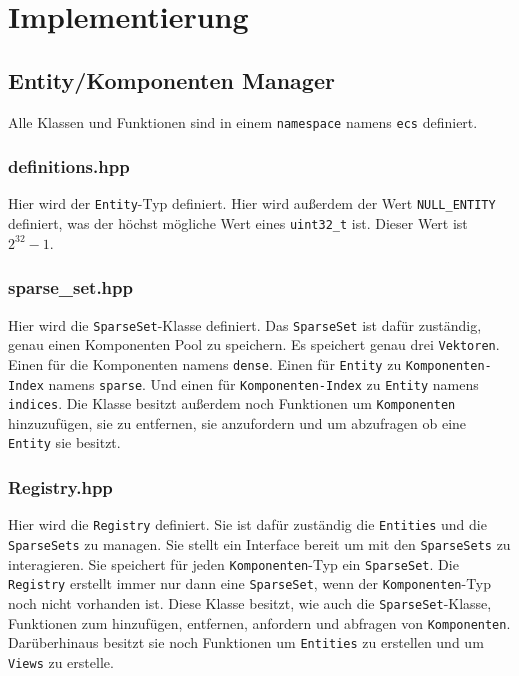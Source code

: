 \documentclass[12pt, a4paper, oneside, ngerman]{scrartcl}
\begin{document}
\section{Implementierung}
\subsection{Entity/Komponenten Manager}
Alle Klassen und Funktionen sind in einem \texttt{namespace} namens \texttt{ecs} definiert.

\subsubsection{definitions.hpp}
Hier wird der \texttt{Entity}-Typ definiert.
Hier wird außerdem der Wert \texttt{NULL\_ENTITY} definiert, was der höchst mögliche Wert eines \texttt{uint32\_t} ist.
Dieser Wert ist $2^{32}-1$.

\subsubsection{sparse\_set.hpp}
Hier wird die \texttt{SparseSet}-Klasse definiert.
Das \texttt{SparseSet} ist dafür zuständig, genau einen Komponenten Pool zu speichern.
Es speichert genau drei \texttt{Vektoren}.
Einen für die Komponenten namens \texttt{dense}.
Einen für \texttt{Entity} zu \texttt{Komponenten-Index} namens \texttt{sparse}.
Und einen für \texttt{Komponenten-Index} zu \texttt{Entity} namens \texttt{indices}.
Die Klasse besitzt außerdem noch Funktionen um \texttt{Komponenten} hinzuzufügen, sie zu entfernen, sie anzufordern und um abzufragen ob eine \texttt{Entity} sie besitzt.

\subsubsection{Registry.hpp}
Hier wird die \texttt{Registry} definiert.
Sie ist dafür zuständig die \texttt{Entities} und die \texttt{SparseSets} zu managen.
Sie stellt ein Interface bereit um mit den \texttt{SparseSets} zu interagieren.
Sie speichert für jeden \texttt{Komponenten}-Typ ein \texttt{SparseSet}.
Die \texttt{Registry} erstellt immer nur dann eine \texttt{SparseSet}, wenn der \texttt{Komponenten}-Typ noch nicht vorhanden ist.
Diese Klasse besitzt, wie auch die \texttt{SparseSet}-Klasse, Funktionen zum hinzufügen, entfernen, anfordern und abfragen von \texttt{Komponenten}.
Darüberhinaus besitzt sie noch Funktionen um \texttt{Entities} zu erstellen und um \texttt{Views} zu erstelle.
\end{document}

